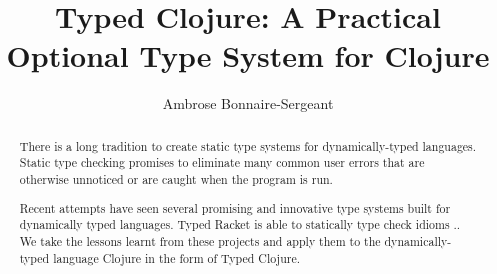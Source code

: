 \documentclass{cshonours}
\title{Typed Clojure: A Practical Optional Type System for Clojure}
\author{Ambrose Bonnaire-Sergeant}
\begin{document}
\maketitle

\begin{abstract}
  There is a long tradition to create static type systems for dynamically-typed
  languages. Static type checking promises to eliminate many common user errors
  that are otherwise unnoticed or are caught when the program is run. 

  Recent attempts have seen several promising and innovative
  type systems built for dynamically typed languages. Typed Racket is able to
  statically type check idioms ..
  We take the lessons learnt from these
  projects and apply them to the dynamically-typed language Clojure in the form of Typed Clojure.
\end{abstract}













%
%

%


\printbibliography[title=References]
\end{document}

